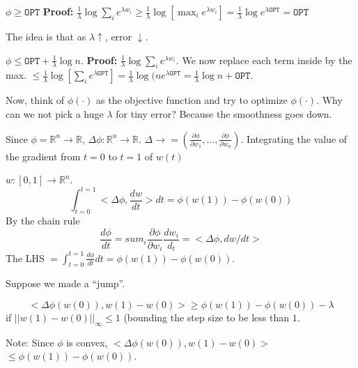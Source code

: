 \begin{lemma}{$\phi \geq \mathtt{OPT}$}
  \textbf{Proof:} $\frac{1}{\lambda} \log \sum_{i} e^{\lambda w_{i}} \geq \frac{1}{\lambda} \log \left[ \max_{i} e^{\lambda w_{i}} \right] = \frac{1}{\lambda} \log e^{\lambda \mathtt{OPT}} = \mathtt{OPT}$
\end{lemma}

The idea is that as $\lambda \uparrow$, error $\downarrow$.

\begin{lemma}{$\phi \leq \mathtt{OPT} + \frac{1}{\lambda} \log n$.}
\textbf{Proof:}  $\frac{1}{\lambda} \log \sum_{i} e^{\lambda w_{i}}$. We now replace each term inside by the max. $\leq \frac{1}{\lambda} \log \left[ \sum_{i} e ^{\lambda \mathtt{OPT}} \right] = \frac{1}{\lambda} \log (n e^{\lambda \mathtt{OPT}} = \frac{1}{\lambda} \log n + \mathtt{OPT}$.
\end{lemma}

Now, think of $\phi(\cdot)$ as the objective function and try to optimize $\phi(\cdot)$.
Why can we not pick a huge $\lambda$ for tiny error? Because the smoothness goes down.

Since $\phi = \mathbb{R}^{n} \rightarrow \mathbb{R}$, $\Delta \phi:\mathbb{R}^{n} \rightarrow \mathbb{R}.$ $\Delta \rightarrow = \left( \frac{\partial \phi}{\partial w_{1}}, ..., \frac{\partial \phi}{\partial w_{n}} \right)$. Integrating the value of the gradient from $t=0$ to $t=1$ of $w(t)$

\begin{theorem}
$w:[0,1]\rightarrow \mathbb{R}^{n}$. 
\begin{equation*}
  \int_{t=0}^{t=1} < \Delta \phi, \frac{dw}{dt}> dt = \phi(w(1)) - \phi(w(0))
\end{equation*}
By the chain rule
\begin{equation*}
  \frac{d \phi}{d t} = sum_{i} \frac{\partial \phi}{\partial w_{i}} \frac{d w_{i}}{d_{t}} = <\Delta \phi, dw/dt>
\end{equation*}
The LHS $= \int_{t=0}^{t=1} \frac{d \phi}{dt} dt = \phi(w(1)) - \phi(w(0))$.
\end{theorem}

Suppose we made a ``jump''.
\begin{theorem}
\label{theorem:small-jump}
\begin{equation*}
  <\Delta \phi(w(0)), w(1) - w(0) > \geq \phi(w(1)) - \phi(w(0)) - \lambda
\end{equation*}
if $||w(1) - w(0)||_{\infty} \leq 1$ (bounding the step size to be less than $1$.  
\end{theorem}
Note: Since $\phi$ is convex,
$<\Delta \phi(w(0)), w(1) - w(0)>$ $\leq \phi(w(1)) - \phi(w(0))$.

